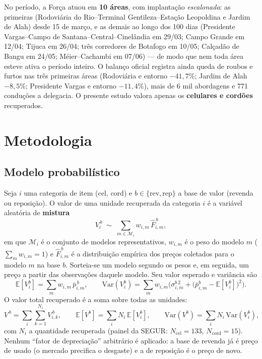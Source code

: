 \documentclass[11pt,a4paper]{article}
\begin{document}
No período, a Força atuou em \textbf{10 áreas}, com implantação \emph{escalonada}: as primeiras
(Rodoviária do Rio--Terminal Gentileza--Estação Leopoldina e Jardim de Alah) desde 15 de março, e
as demais ao longo dos 100 dias (Presidente Vargas--Campo de Santana--Central--Cinelândia em 29/03;
Campo Grande em 12/04; Tijuca em 26/04; três corredores de Botafogo em 10/05; Calçadão de
Bangu em 24/05; Méier--Cachambi em 07/06) --- de modo que nem toda área esteve ativa o período
inteiro. O balanço oficial registra ainda queda de roubos e furtos nas três primeiras áreas
(Rodoviária e entorno $-41{,}7\%$; Jardim de Alah $-8{,}5\%$; Presidente Vargas e entorno
$-11{,}4\%$), mais de 6 mil abordagens e 771 conduções a delegacia. O presente estudo valora apenas
os \textbf{celulares e cordões} recuperados.

\section{Metodologia}

\subsection{Modelo probabilístico}
Seja $i$ uma categoria de item ($\text{cel}$, $\text{cord}$) e
$b\in\{\text{rev},\text{rep}\}$ a base de valor (revenda ou reposição). O valor de uma unidade
recuperada da categoria $i$ é a variável aleatória de \textbf{mistura}
\begin{equation}
  V_i^{\,b}\;\sim\;\sum_{m\in\mathcal{M}_i} w_{i,m}\,\hat F_{i,m}^{\,b},
  \label{eq:mix}
\end{equation}
em que $\mathcal{M}_i$ é o conjunto de modelos representativos, $w_{i,m}$ é o peso do modelo $m$
($\sum_m w_{i,m}=1$) e $\hat F_{i,m}^{\,b}$ é a distribuição empírica dos preços coletados para o
modelo $m$ na base $b$. Sorteia-se um modelo segundo os pesos e, em seguida, um preço a partir das
observações daquele modelo. Seu valor esperado e variância são
\begin{equation}
  \mathbb{E}[V_i^{b}]=\sum_m w_{i,m}\,\bar p_{i,m}^{\,b},
  \qquad
  \mathrm{Var}(V_i^{b})=\sum_m w_{i,m}\Big(\sigma_{i,m}^{b\,2}+\big(\bar p_{i,m}^{b}-\mathbb{E}[V_i^b]\big)^2\Big).
  \label{eq:moments}
\end{equation}
O valor total recuperado é a soma sobre todas as unidades:
\begin{equation}
  V^{\,b}=\sum_{i}\sum_{k=1}^{N_i} V_{i,k}^{\,b},
  \qquad
  \mathbb{E}[V^{b}]=\sum_i N_i\,\mathbb{E}[V_i^{b}],
  \qquad
  \mathrm{Var}(V^{b})=\sum_i N_i\,\mathrm{Var}(V_i^{b}),
  \label{eq:total}
\end{equation}
com $N_i$ a quantidade recuperada (painel da SEGUR: $N_{\text{cel}}=133$, $N_{\text{cord}}=15$).
Nenhum ``fator de depreciação'' arbitrário é aplicado: a base de revenda já é preço de usado (o
mercado precifica o desgaste) e a de reposição é o preço de novo.
\end{document}
